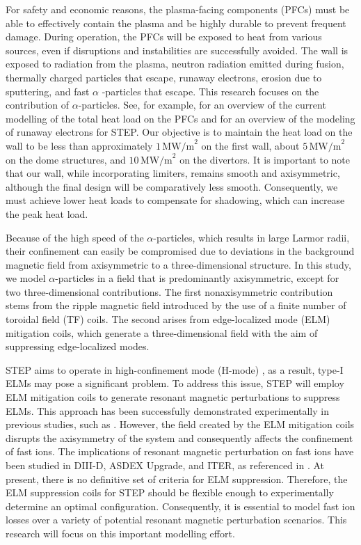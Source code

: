 \documentclass[10pt, a4paper, twoside]{article}
\begin{document}
For safety and economic reasons, the plasma-facing components (PFCs) must be able to effectively contain the plasma and be highly durable to prevent frequent damage. During operation, the PFCs will be exposed to heat from various sources, even if disruptions and instabilities are successfully avoided. The wall is exposed to radiation from the plasma, neutron radiation emitted during fusion, thermally charged particles that escape, runaway electrons, erosion due to sputtering, and fast $\alpha$ -particles that escape. This research focuses on the contribution of $\alpha$-particles. See, for example, \cite{zsolt2023} for an overview of the current modelling of the total heat load on the PFCs and \cite{fil2023} for an overview of the modeling of runaway electrons for STEP. Our objective is to maintain the heat load on the wall to be less than approximately $1\, \text{MW/m}^2$ on the first wall, about $5\, \text{MW/m}^2$ on the dome structures, and $10\, \text{MW/m}^2$ on the divertors. It is important to note that our wall, while incorporating limiters, remains smooth and axisymmetric, although the final design will be comparatively less smooth. Consequently, we must achieve lower heat loads to compensate for shadowing, which can increase the peak heat load.

Because of the high speed of the $\alpha$-particles, which results in large Larmor radii, their confinement can easily be compromised due to deviations in the background magnetic field from axisymmetric to a three-dimensional structure.  In this study, we model $\alpha$-particles in a field that is predominantly axisymmetric, except for two three-dimensional contributions. The first nonaxisymmetric contribution stems from the ripple magnetic field introduced by the use of a finite number of toroidal field (TF) coils. The second arises from edge-localized mode (ELM) \cite{zohm1996} mitigation coils, which generate a three-dimensional field with the aim of suppressing edge-localized modes.

STEP aims to operate in high-confinement mode (H-mode) \cite{wagner1982}, as a result, type-I ELMs may pose a significant problem. To address this issue, STEP will employ ELM mitigation coils to generate resonant magnetic perturbations to suppress ELMs. This approach has been successfully demonstrated experimentally in previous studies, such as \cite{suttrop2018}. However, the field created by the ELM mitigation coils disrupts the axisymmetry of the system and consequently affects the confinement of fast ions. The implications of resonant magnetic perturbation on fast ions have been studied in DIII-D, ASDEX Upgrade, and ITER, as referenced in \cite{van2015,sanchis2018,ward2022}. At present, there is no definitive set of criteria for ELM suppression. Therefore, the ELM suppression coils for STEP should be flexible enough to experimentally determine an optimal configuration. Consequently, it is essential to model fast ion losses over a variety of potential resonant magnetic perturbation scenarios. This research will focus on this important modelling effort.
\end{document}
